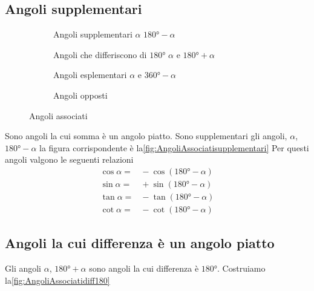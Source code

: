 \subsection{Angoli supplementari}
\begin{figure}
	\centering
	\begin{subfigure}[b]{.48\linewidth}
	\centering
	\caption{Angoli supplementari $\alpha$ $\ang{180}-\alpha$}\label{fig:AngoliAssociatisupplementari}		
 \end{subfigure}
 \begin{subfigure}[b]{.48\linewidth}
 	\centering
 	
 	\caption{Angoli che differiscono di $\ang{180}$ $\alpha$ e $\ang{180}+\alpha$}
 	\label{fig:AngoliAssociatidiff180}	
 \end{subfigure}
 	\begin{subfigure}[b]{.49\linewidth}
 		\centering
 		
 		\caption{Angoli esplementari $\alpha$ e $\ang{360}-\alpha$}\label{fig:Angolidif360}
 	\end{subfigure}
 	\begin{subfigure}[b]{.49\linewidth}
 		\centering
 		
 		\caption{Angoli opposti}\label{fig:angoliopposti}
 	\end{subfigure}
\caption{Angoli associati}
	\label{fig:angoliassociati}
\end{figure}
Sono angoli la cui somma è un angolo piatto.  Sono supplementari  gli angoli, $\alpha$, $\ang{180}-\alpha$ la figura corrispondente è la\nobs\vref{fig:AngoliAssociatisupplementari}
Per questi angoli valgono le seguenti relazioni
\begin{align*}
\cos\alpha=&{}-\cos(\ang{180}-\alpha)\\
\sin\alpha=&{}+\sin(\ang{180}-\alpha)\\
\tan\alpha=&{}-\tan(\ang{180}-\alpha)\\
\cot\alpha=&{}-\cot(\ang{180}-\alpha)
\end{align*}
\subsection{Angoli la cui differenza è un angolo piatto}
\label{sub:Dif180}
Gli angoli $\alpha$, $\ang{180}+\alpha$ sono angoli la cui differenza è $\ang{180}$. Costruiamo la\nobs\vref{fig:AngoliAssociatidiff180}

